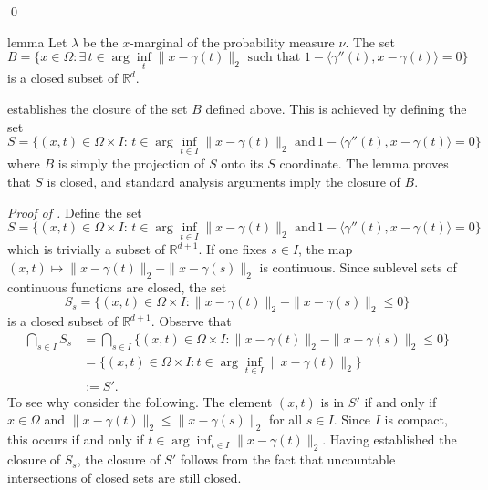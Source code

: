 \documentclass[11pt]{article}
\begin{document}
\qed{}



\begin{restatable}{lemma}{} \label{lemma: IFT degen closed}
    Let $\lambda$ be the $x$-marginal of the probability measure $\nu$. The set 
    \begin{equation}
    B= \{x \in \Omega : \exists \,t \in \arg\inf_t \|x-\gamma(t)\|_2 \text{ such that } 1 - \langle\gamma''(t), x-\gamma(t)\rangle = 0 \}
    \end{equation}
    is a closed subset of $\mathbb{R}^d$. 
\end{restatable}
\noindent {} establishes the closure of the set $B$ defined above. This is achieved by defining the set 
\[S= \{(x,t) \in \Omega\times I : \, t \in \arg\inf_{t\in I}\|x-\gamma(t)\|_2 \text{ and} \, 1 - \langle\gamma''(t), x - \gamma(t)\rangle = 0\} \]
where $B$ is simply the projection of $S$ onto its $S$ coordinate. The lemma proves that $S$ is closed, and standard analysis arguments imply the closure of $B$.  

\textit{Proof of .} Define the set
\begin{equation}
S= \{(x,t) \in \Omega\times I : \, t \in \arg\inf_{t\in I}\|x-\gamma(t)\|_2 \text{ and} \, 1 - \langle\gamma''(t), x - \gamma(t)\rangle = 0\} \label{eq: S}
\end{equation}
which is trivially a subset of $\mathbb{R}^{d+1}$. If one fixes $s \in I$, the map $(x,t) \mapsto \|x-\gamma(t)\|_2 - \|x-\gamma(s)\|_2$ is continuous. Since sublevel sets of continuous functions are closed, the set
\begin{equation}
S_s = \{(x,t) \in \Omega \times I : \|x-\gamma(t)\|_2 - \|x-\gamma(s)\|_2 \leq 0\}
\end{equation}
is a closed subset of $\mathbb{R}^{d+1}$. Observe that
\begin{align*}
    \bigcap_{s \in I} S_s &= \bigcap_{s \in I} \Big\{(x,t) \in \Omega \times I : \|x-\gamma(t)\|_2 - \|x-\gamma(s)\|_2 \leq 0\Big \} \\
    &= \Big\{(x,t)  \in \Omega \times I: t\in \arg\inf_{t\in I}\|x-\gamma(t)\|_2 \Big \} \\
    &:= S'.
\end{align*}
To see why consider the following. The element $(x,t)$ is in $S'$ if and only if $x \in \Omega$ and $\|x - \gamma(t)\|_2  \leq \|x - \gamma(s)\|_2$ for all $s \in I$. Since $I$ is compact, this occurs if and only if $t \in \arg\inf_{t \in I} \|x - \gamma(t)\|_2$. Having established the closure of $S_s$, the closure of $S'$ follows from the fact that uncountable intersections of closed sets are still closed. 
\end{document}
